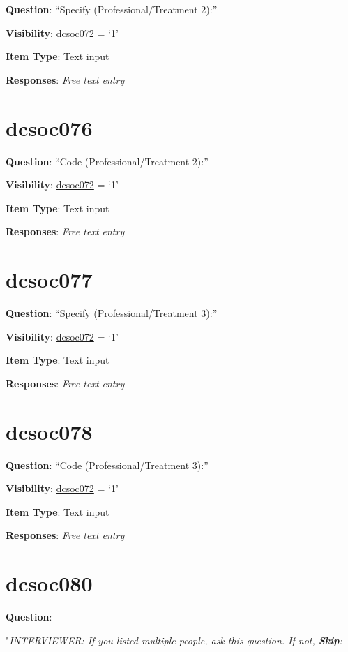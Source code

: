\documentclass[]{book}
\begin{document}
\textbf{Question}: ``Specify (Professional/Treatment 2):''

\textbf{Visibility}: \protect\hyperlink{dcsoc072}{dcsoc072} = `1'

\textbf{Item Type}: Text input

\textbf{Responses}: \emph{Free text entry}

\hypertarget{dcsoc076}{%
\section{dcsoc076}\label{dcsoc076}}

\textbf{Question}: ``Code (Professional/Treatment 2):''

\textbf{Visibility}: \protect\hyperlink{dcsoc072}{dcsoc072} = `1'

\textbf{Item Type}: Text input

\textbf{Responses}: \emph{Free text entry}

\hypertarget{dcsoc077}{%
\section{dcsoc077}\label{dcsoc077}}

\textbf{Question}: ``Specify (Professional/Treatment 3):''

\textbf{Visibility}: \protect\hyperlink{dcsoc072}{dcsoc072} = `1'

\textbf{Item Type}: Text input

\textbf{Responses}: \emph{Free text entry}

\hypertarget{dcsoc078}{%
\section{dcsoc078}\label{dcsoc078}}

\textbf{Question}: ``Code (Professional/Treatment 3):''

\textbf{Visibility}: \protect\hyperlink{dcsoc072}{dcsoc072} = `1'

\textbf{Item Type}: Text input

\textbf{Responses}: \emph{Free text entry}

\hypertarget{dcsoc080}{%
\section{dcsoc080}\label{dcsoc080}}

\textbf{Question}:

"\emph{INTERVIEWER: If you listed multiple people, ask this question. If not, \textbf{Skip}:}
\end{document}
